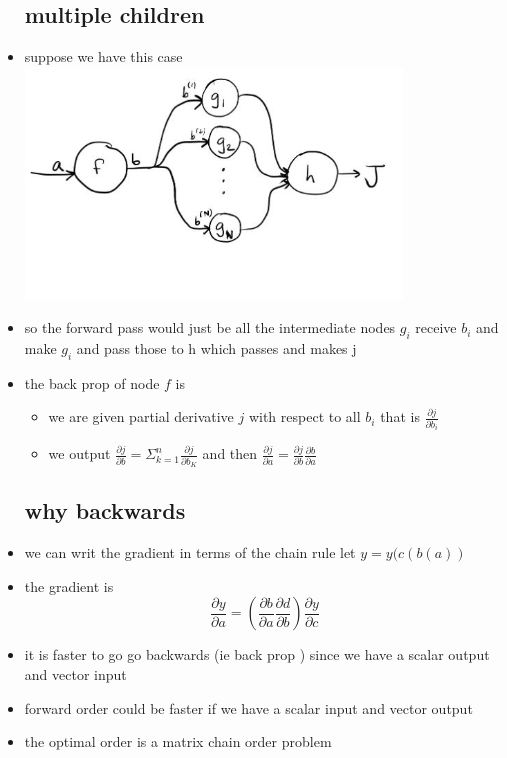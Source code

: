 \documentclass{article}
\begin{document}
\begin{itemize}
\subsection{multiple children}
\item suppose we have this case \\ \includegraphics[width=10cm]{lecture_notes/lecture_11/immages/l11_17.JPG}
\item so the forward pass would just be all the intermediate nodes $g_i$ receive $b_i$ and make $g_i$ and pass those to h which passes and makes j
\item the back prop of node $f$ is 
\begin{itemize}
    \item we are given partial derivative $j$ with respect to  all $b_i$ that is $\frac{\partial j}{\partial b_i}$
    \item we output $\frac{\partial j}{\partial b}=\Sigma_{k=1}^{n}\frac{\partial j}{\partial b_K}$ and then $\frac{\partial j}{\partial a}=\frac{\partial j}{\partial b}\frac{\partial b}{\partial a}$

\end{itemize}
\subsection{why backwards}
\item we can writ the gradient in terms of the chain rule let $y=y(c(b(a))$
\item the gradient is $$\frac{\partial y}{\partial a}=(\frac{\partial b}{\partial a}\frac{\partial d}{\partial b})\frac{\partial y}{\partial c}$$
\item it is faster to go go backwards (ie back prop ) since we have a scalar output and vector input
\item forward order could be faster if we have a scalar input and vector output 
\item the optimal order is a matrix chain order problem 

\end{itemize}
\end{document}
